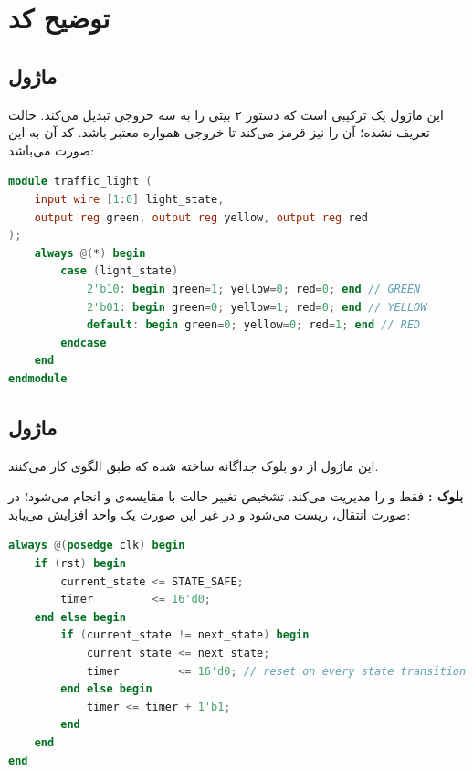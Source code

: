 \section{توضیح کد}

\subsection{ماژول }
این ماژول یک  ترکیبی است که دستور ۲ بیتی  را به سه خروجی  تبدیل می‌کند. حالت  تعریف نشده؛  آن را نیز قرمز می‌کند تا خروجی همواره معتبر باشد. کد آن به این صورت می‌باشد:

\vspace{0.4cm}
\begin{latin}
    \begin{lstlisting}[language=Verilog]
module traffic_light (
    input wire [1:0] light_state,
    output reg green, output reg yellow, output reg red
);
    always @(*) begin
        case (light_state)
            2'b10: begin green=1; yellow=0; red=0; end // GREEN
            2'b01: begin green=0; yellow=1; red=0; end // YELLOW
            default: begin green=0; yellow=0; red=1; end // RED
        endcase
    end
endmodule
\end{lstlisting}
\end{latin}

\subsection{ماژول }
این ماژول از دو بلوک  جداگانه ساخته شده که طبق الگوی  کار می‌کنند.

\textbf{بلوک :} فقط  و  را مدیریت می‌کند. تشخیص تغییر حالت با مقایسه‌ی  و  انجام می‌شود؛ در صورت انتقال،  ریست می‌شود و در غیر این صورت یک واحد افزایش می‌یابد:

\vspace{0.4cm}
\begin{latin}
    \begin{lstlisting}[language=Verilog]
always @(posedge clk) begin
    if (rst) begin
        current_state <= STATE_SAFE;
        timer         <= 16'd0;
    end else begin
        if (current_state != next_state) begin
            current_state <= next_state;
            timer         <= 16'd0; // reset on every state transition
        end else begin
            timer <= timer + 1'b1;
        end
    end
end
\end{lstlisting}
\end{latin}

